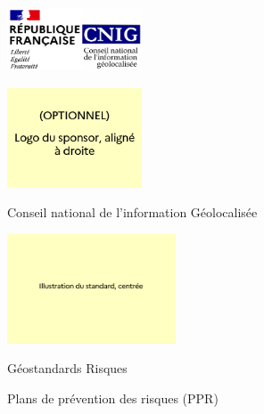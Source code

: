 \documentclass[a4paper,12pt]{article}
\begin{document}
\begin{titlepage}
    \centering

    \begin{minipage}{0.45\textwidth}
        \raggedright
        \includegraphics[width=4cm]{./ressources/logo_cnig.png}
    \end{minipage}
    \hfill
    \begin{minipage}{0.45\textwidth}
        \raggedleft
        \includegraphics[width=4cm]{./ressources/logo_sponsor.PNG}
    \end{minipage}

    \vspace{1cm}

    {\marianne\large\color{etatbleu} Conseil national de l'information Géolocalisée\par}

    \vspace{1.5cm}

    \includegraphics[width=5cm]{./ressources/illustration_standard.PNG}

    \vspace{1.5cm}

    {\marianne\fontsize{27pt}{26pt}\selectfont\color{etatbleu} Géostandards Risques\par}

    \vspace{0.5cm}

    {\marianne\large\color{etatbleu} Plans de prévention des risques (PPR)\par}


\end{titlepage}
\end{document}
